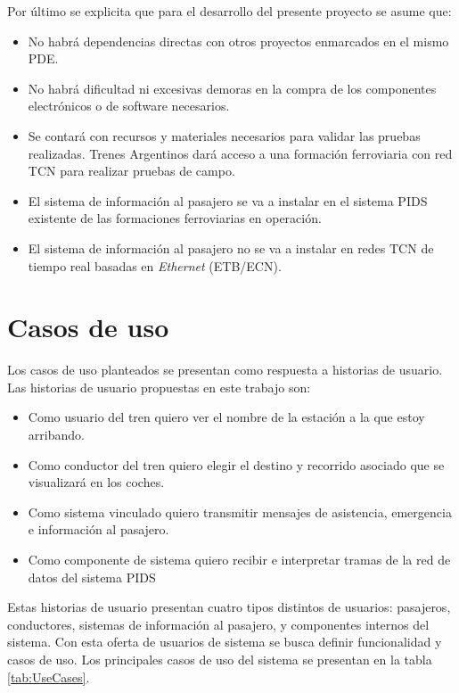 Por último se explicita que para el desarrollo del presente proyecto se asume que:

\begin{itemize}
\item No habrá dependencias directas con otros proyectos enmarcados en el mismo PDE\citep{PDE-TCN}.
\item No habrá dificultad ni excesivas demoras en la compra de los componentes electrónicos o
de software necesarios.
\item Se contará con recursos y materiales necesarios para validar las pruebas realizadas.
Trenes Argentinos dará acceso a una formación ferroviaria con red TCN para realizar
pruebas de campo.
\item El sistema de información al pasajero se va a instalar en el sistema PIDS existente de las formaciones ferroviarias en operación.
\item El sistema de información al pasajero no se va a instalar en redes TCN de tiempo real
basadas en \textit{Ethernet} (ETB/ECN).
\end{itemize}


\section{Casos de uso}
Los casos de uso planteados se presentan como respuesta a historias de usuario. Las historias de usuario propuestas en este trabajo son:
\begin{itemize}
\item Como usuario del tren quiero ver el nombre de la estación a la que estoy arribando.
\item Como conductor del tren quiero elegir el destino y recorrido asociado que se visualizará en los coches.
\item Como sistema vinculado quiero transmitir mensajes de asistencia, emergencia e información al pasajero.
\item Como componente de sistema quiero recibir e interpretar tramas de la red de datos del sistema PIDS
\end{itemize}

Estas historias de usuario presentan cuatro tipos distintos de usuarios: pasajeros, conductores, sistemas de información al pasajero, y componentes internos del sistema. Con esta oferta de usuarios de sistema se busca definir funcionalidad y casos de uso. Los principales casos de uso del sistema se presentan en la tabla \ref{tab:UseCases}. \\

